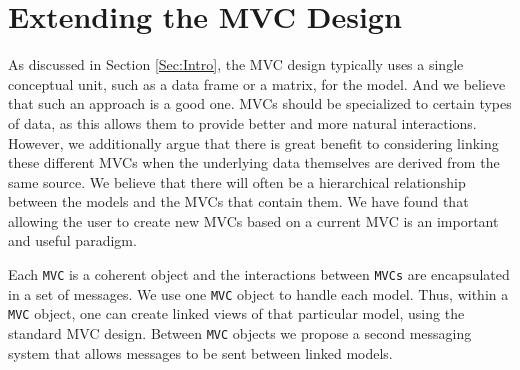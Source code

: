 \documentclass[11pt]{article}
\newcommand{\Robject}[1]{{\texttt{#1}}}
\begin{document}
\section{Extending the MVC Design}
\label{Sec:Extend}

As discussed in Section \ref{Sec:Intro}, the MVC design typically uses a single
conceptual unit, such as a data frame or a matrix, for the model.  And
we believe that such an approach is a good one.  MVCs should be
specialized to certain types of data, as this allows them to provide
better and more natural interactions.  However, we additionally argue
that there is great benefit to considering linking these different
MVCs when the underlying data themselves are derived from the same source.
We believe that there will often be a hierarchical relationship
between the models and the MVCs that contain them.  We have found
that allowing the user to create new MVCs based on a current MVC is an
important and useful paradigm.

Each \Robject{MVC} is a coherent object and the interactions between
\Robject{MVCs} are encapsulated in a set of messages.  We use one
\Robject{MVC} object to handle each model.  Thus, within a
\Robject{MVC} object, one can create linked views of that particular
model, using the standard MVC design.  Between \Robject{MVC}
objects we propose a second messaging system that allows messages to
be sent between linked models.

\end{document}
